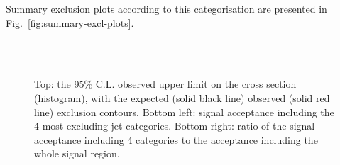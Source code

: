 Summary exclusion plots according to this categorisation are presented in Fig.~\ref{fig:summary-excl-plots}. 



\newpage
\begin{figure}[h!]
  \begin{center}
     \\
     ~~
    \caption{
      Top: the 95\% C.L. observed upper limit on the cross section (histogram), with the expected (solid black line) observed (solid red line) exclusion contours. 
      Bottom left: signal acceptance including the 4 most excluding jet categories. 
      Bottom right: ratio of the signal acceptance including 4 categories to the acceptance including the whole signal region. 
    }
    \label{fig:T1bbbb}
  \end{center}
\end{figure}


